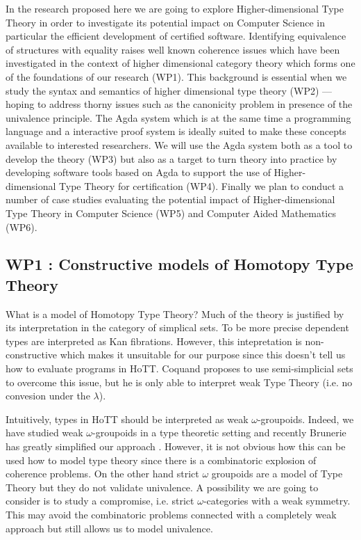\documentclass[twocolumn,a4paper,11pt]{article}
\begin{document}
{In the research proposed here we are going to explore
Higher-dimensional Type Theory in order to investigate its potential
impact on Computer Science in particular the efficient development of
certified software. Identifying equivalence of structures with
equality raises well known coherence issues which have been
investigated in the context of higher dimensional category theory
\cite{eugenia} which forms one of the foundations of our research
(WP1). This background is essential when we study the syntax and
semantics of higher dimensional type theory (WP2) --- hoping to
address thorny issues such as the canonicity problem in presence of
the univalence principle. The Agda system \cite{Agda}
which is at the same time a programming language and a interactive
proof system is ideally suited to make these concepts available to
interested researchers. We will use the Agda system both as a tool to
develop the theory (WP3) but also as a target to turn theory into
practice by developing software tools based on Agda to support the use
of Higher-dimensional Type Theory for certification (WP4). Finally we
plan to conduct a number of case studies evaluating the potential
impact of Higher-dimensional Type Theory in Computer Science (WP5) and
Computer Aided Mathematics (WP6).

\subsection*{WP1 : Constructive models of Homotopy Type Theory}
\label{sec:wp:qio}

What is a model of Homotopy Type Theory? Much of the theory is
justified by its interpretation in the category of simplical sets. To
be more precise dependent types are interpreted as Kan fibrations. 
However, this intepretation is non-constructive which makes it
unsuitable for our purpose since this doesn't tell us how to evaluate
programs in HoTT. Coquand \cite{coquand:semi} proposes to use
semi-simplicial sets to overcome this issue, but he is only able to
interpret weak Type Theory (i.e. no convesion under the $\lambda$). 

Intuitively, types in HoTT should be interpreted as weak
$\omega$-groupoids. Indeed, we have studied weak $\omega$-groupoids 
in a type theoretic setting \cite{altiRypacek:weakOmegaGrp} and
recently Brunerie has greatly simplified our approach
\cite{brunery:wgpds}. However, it is not obvious how this can be used
how to model type theory since there is a combinatoric explosion of
coherence problems. On the other hand strict $\omega$ groupoids are a model of Type
Theory \cite{Warren:PhD} but they do not validate univalence. A
possibility we are going to consider is to study a 
compromise, i.e. strict $\omega$-categories with a weak symmetry.
This may avoid the combinatoric problems connected with a completely
weak approach but still allows us to model univalence.

}
\end{document}
